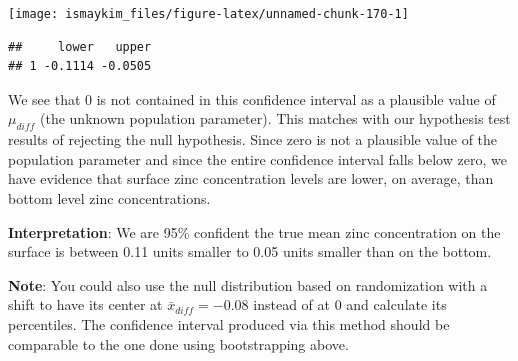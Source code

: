 \documentclass[]{tufte-book}
\newenvironment{Shaded}{\begin{snugshade}}{\end{snugshade}}
\newcommand{\KeywordTok}[1]{\textcolor[rgb]{0.13,0.29,0.53}{\textbf{{#1}}}}
\newcommand{\DataTypeTok}[1]{\textcolor[rgb]{0.13,0.29,0.53}{{#1}}}
\newcommand{\DecValTok}[1]{\textcolor[rgb]{0.00,0.00,0.81}{{#1}}}
\newcommand{\FloatTok}[1]{\textcolor[rgb]{0.00,0.00,0.81}{{#1}}}
\newcommand{\StringTok}[1]{\textcolor[rgb]{0.31,0.60,0.02}{{#1}}}
\newcommand{\NormalTok}[1]{{#1}}
\theoremstyle{definition}
\theoremstyle{definition}
\theoremstyle{remark}
\begin{document}
\begin{Shaded}
\end{Shaded}

\begin{center}\texttt{[image: ismaykim\_files/figure-latex/unnamed-chunk-170-1]} \end{center}

\begin{Shaded}
\end{Shaded}

\begin{verbatim}
##     lower   upper
## 1 -0.1114 -0.0505
\end{verbatim}

We see that 0 is not contained in this confidence interval as a
plausible value of \(\mu_{diff}\) (the unknown population parameter).
This matches with our hypothesis test results of rejecting the null
hypothesis. Since zero is not a plausible value of the population
parameter and since the entire confidence interval falls below zero, we
have evidence that surface zinc concentration levels are lower, on
average, than bottom level zinc concentrations.

\textbf{Interpretation}: We are 95\% confident the true mean zinc
concentration on the surface is between 0.11 units smaller to 0.05 units
smaller than on the bottom.

\textbf{Note}: You could also use the null distribution based on
randomization with a shift to have its center at
\(\bar{x}_{diff} = -0.08\) instead of at 0 and calculate its
percentiles. The confidence interval produced via this method should be
comparable to the one done using bootstrapping above.
\end{document}
